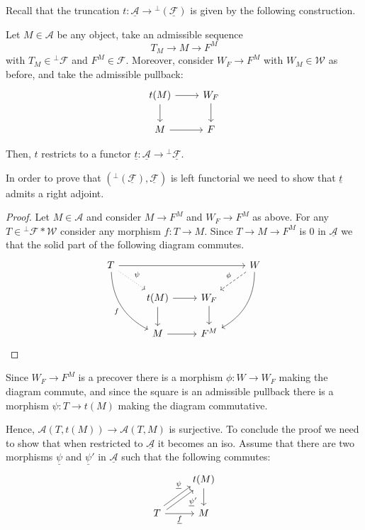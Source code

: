 Recall that the truncation $t:\underline{\mathcal{A}}\to {^\perp(\underline{\mathcal{F}})}$ is given by the following construction.

Let $M\in\mathcal{A}$ be any object, take an admissible sequence
\begin{equation*}
  T_M\to M\to F^M
\end{equation*}
with $T_M\in{^\perp\mathcal{F}}$ and $F^M\in\mathcal{F}$. Moreover, consider $W_F\to F^M$ with $W_M\in\mathcal{W}$
as before, and take the admissible pullback:
\begin{equation*}
  \begin{tikzcd}
    t(M)\arrow{d}\arrow{r}&W_F\arrow{d}\\
    M\arrow{r}&F
  \end{tikzcd}
\end{equation*}

Then, $t$ restricts to a functor $\underline{t}:\underline{\mathcal{A}}\to {^\perp\underline{\mathcal{F}}}$.

In order to prove that $(^\perp(\underline{\mathcal{F}}),\underline{\mathcal{F}})$ is left functorial we
need to show that $\underline{t}$ admits a right adjoint.

\begin{proof}
  Let $M\in\mathcal{A}$ and consider $M\to F^M$ and $W_F\to F^M$ as above.
  For any $T\in{^\perp\mathcal{F}\ast \mathcal{W}}$ consider any morphism
  $f:T\to M$. Since $T\to M\to F^M$ is 0 in $\underline{\mathcal{A}}$ we that the solid part of the
  following diagram commutes.
  \begin{equation*}
    \begin{tikzcd}
      T\arrow[bend right]{ddr}[']{f}\arrow{rrr}\arrow[dotted]{dr}{\psi}
        & & & W\arrow[dashed]{ld}[']{\phi}\arrow[bend left]{ddl}
              \\
        & t(M)\arrow{r}\arrow{d}
          & W_F\arrow{d}
            & \\
        & M\arrow{r}
          & F^M
            &
    \end{tikzcd}
  \end{equation*}
\end{proof}

Since $W_F\to F^M$ is a precover there is a morphism $\phi:W\to W_F$ making the diagram commute, and
since the square is an admissible pullback there is a morphism $\psi:T\to t(M)$ making the diagram commutative.

Hence, $\mathcal{A}(T,t(M))\to \mathcal{A}(T,M)$ is surjective. To conclude the proof we need to show
that when restricted to $\underline{\mathcal{A}}$ it becomes an iso. Assume that there are two morphisms
$\underline{\psi}$ and $\underline{\psi}'$ in $\underline{\mathcal{A}}$ such that the following commutes:
\begin{equation*}
  \begin{tikzcd}
    & t(M)\arrow{d}\\
    T\arrow[shift left=-1]{ur}[near end,']{\underline{\psi}'}
    \arrow[shift left=1]{ur}[near end]{\underline{\psi}}
    \arrow{r}[']{\underline{f}}
      & M
  \end{tikzcd}
\end{equation*}

